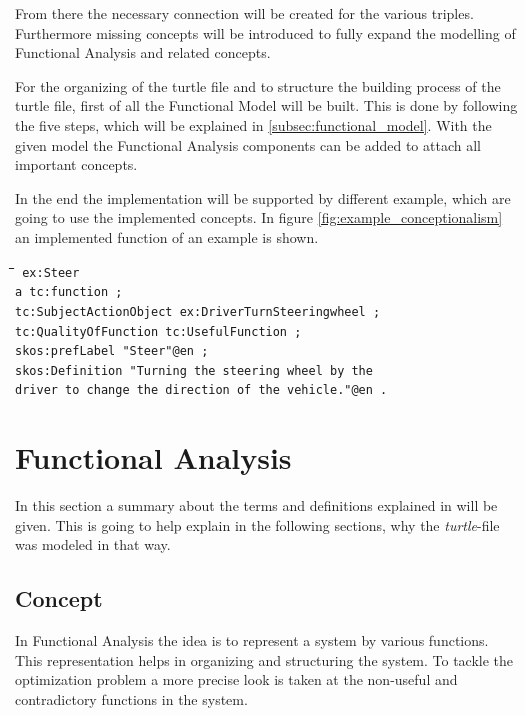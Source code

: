\documentclass[11pt,a4paper]{article}
\newenvironment{code}{\tt \begin{tabbing}
\hskip12pt\=\hskip12pt\=\hskip12pt\=\hskip12pt\=\hskip5cm\=\hskip5cm\=\kill}
{\end{tabbing}}
\begin{document}
From there the necessary connection will be created for the various triples.
Furthermore missing concepts will be introduced to fully expand the modelling
of Functional Analysis and related concepts.

For the organizing of the turtle file and to structure the building process of
the turtle file, first of all the Functional Model will be built.  This is
done by following the five steps, which will be explained in
\ref{subsec:functional_model}.  With the given model the Functional Analysis
components can be added to attach all important concepts.

In the end the implementation will be supported by different example, which
are going to use the implemented concepts.  In figure
\ref{fig:example_conceptionalism} an implemented function of an example is
shown.

\begin{code}\tt
  ex:Steer\\
  \> a tc:function ;\\
  \> tc:SubjectActionObject ex:DriverTurnSteeringwheel ;\\
  \> tc:QualityOfFunction tc:UsefulFunction ;\\
  \> skos:prefLabel "Steer"@en ;\\
  \> skos:Definition "Turning the steering wheel by the\\
  \> \> driver to change the direction of the vehicle."@en .
\end{code}

\section{Functional Analysis}
\label{sec:functional_analysis}

In this section a summary about the terms and definitions explained in
\cite{KS} will be given.  This is going to help explain in the following
sections, why the \emph{turtle}-file was modeled in that way.

\subsection{Concept}

In Functional Analysis the idea is to represent a system by various functions.
This representation helps in organizing and structuring the system.  To tackle
the optimization problem a more precise look is taken at the non-useful and
contradictory functions in the system.
\end{document}
